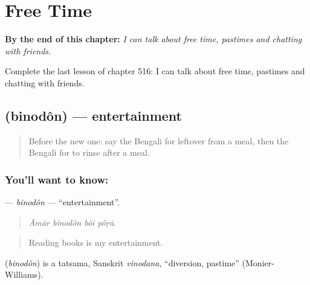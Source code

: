 
\chapter{Free Time}
\label{ch:bn-free-time}

\begin{chapteropening}
\textbf{By the end of this chapter:} \emph{I can talk about free time, pastimes and chatting with friends.}

Complete the last lesson of chapter 516: I can talk about free time, pastimes and chatting with friends.
\end{chapteropening}

\section[\texorpdfstring{\bn{বিনোদন} (binodôn)}{বিনোদন (binodôn)}]{ (binodôn) — entertainment}

\label{lesson:BN-C516-binodon}



\begin{quote}
Before the new one: say the Bengali for leftover from a meal, then the Bengali for to rinse after a meal.
\end{quote}

\subsection*{You'll want to know: }
\textbf{} — \emph{binodôn} — \textquotedblleft{}entertainment\textquotedblright{}.

\begin{quote}
   
\end{quote}

\begin{quote}
\emph{Āmār binodôn bôi pôṛā.}
\end{quote}

\begin{quote}
Reading books is my entertainment.
\end{quote}

\begin{cousinweb}
\textbf{} (\emph{binodôn}) is a tatsama, Sanskrit \emph{vinodana}, \textquotedblleft{}diversion, pastime\textquotedblright{} (Monier-Williams).
\end{cousinweb}

